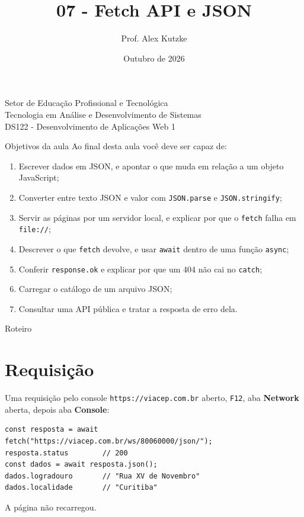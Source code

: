 \documentclass{beamer}
\title{07 - Fetch API e JSON}
\author{Prof. Alex Kutzke}
\date{Outubro de 2026}
\begin{document}
\begin{frame}
	\begin{center}
		\large{Setor de Educação Profissional e Tecnológica}\\
		Tecnologia em Análise e Desenvolvimento de Sistemas\\
		\vspace{1cm}
		\small{DS122 - Desenvolvimento de Aplicações Web 1}
	\end{center}
	\titlepage
\end{frame}

\begin{frame}{Objetivos da aula}
	Ao final desta aula você deve ser capaz de:
	\begin{enumerate}
		\item Escrever dados em JSON, e apontar o que muda em relação a um objeto
		      JavaScript;
		\item Converter entre texto JSON e valor com \texttt{JSON.parse} e
		      \texttt{JSON.stringify};
		\item Servir as páginas por um servidor local, e explicar por que o
		      \texttt{fetch} falha em \texttt{file://};
		\item Descrever o que \texttt{fetch} devolve, e usar \texttt{await} dentro
		      de uma função \texttt{async};
		\item Conferir \texttt{response.ok} e explicar por que um 404 não cai no
		      \texttt{catch};
		\item Carregar o catálogo de um arquivo JSON;
		\item Consultar uma API pública e tratar a resposta de erro dela.
	\end{enumerate}
\end{frame}

\begin{frame}{Roteiro}
	\tableofcontents
\end{frame}

\section{Requisição}

\begin{frame}[fragile]{Uma requisição pelo console}
	\texttt{https://viacep.com.br} aberto, \texttt{F12}, aba \textbf{Network}
	aberta, depois aba \textbf{Console}:

	\begin{verbatim}
const resposta = await fetch("https://viacep.com.br/ws/80060000/json/");
resposta.status        // 200
const dados = await resposta.json();
dados.logradouro       // "Rua XV de Novembro"
dados.localidade       // "Curitiba"
	\end{verbatim}

	\vspace{0.3cm}
	A página não recarregou.
\end{frame}
\end{document}
